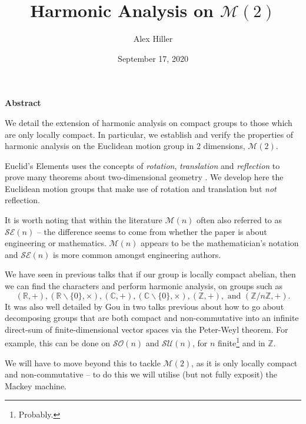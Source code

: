 \documentclass{article}
\author{Alex Hiller}
\title{Harmonic Analysis on $\mathcal{M}(2)$}
\date{September 17, 2020}
\begin{document}
\maketitle
\begin{center}
    \textbf{Abstract}
\end{center}
We detail the extension of harmonic analysis on compact groups to those which are only locally compact. In particular, we establish and verify the properties of harmonic analysis on the Euclidean motion group in 2 dimensions, $\mathcal{M}(2)$.

\clearpage

Euclid's Elements uses the concepts of \textit{rotation}, \textit{translation} and \textit{reflection} to prove many theorems about two-dimensional geometry \cite{euclids_elements}. We develop here the Euclidean motion groups that make use of {rotation} and {translation} but \textit{not} reflection. \par
It is worth noting that within the literature $\mathcal{M}(n)$ often also referred to as $\mathcal{SE}(n)$ -- the difference seems to come from whether the paper is about engineering or mathematics. $\mathcal{M}(n)$ appears to be the mathematician's notation and $\mathcal{SE}(n)$ is more common amongst engineering authors.

We have seen in previous talks that if our group is locally compact abelian, then we can find the characters and perform harmonic analysis, on groups such as \[(\mathbb{R}, +), (\mathbb{R}\backslash \{ 0 \}, \times),(\mathbb{C}, +), (\mathbb{C}\backslash \{ 0 \}, \times),  (\mathbb{Z}, +), \text{ and }(\mathbb{Z}/n\mathbb{Z}, +).\]
It was also well detailed by Gou in two talks previous about how to go about decomposing groups that are both compact and non-commutative into an infinite direct-sum of finite-dimensional vector spaces via the Peter-Weyl theorem. For example, this can be done on $\mathcal{SO}(n)$ and $\mathcal{SU}(n)$, for $n$ finite\footnote{Probably.} and in $\mathbb{Z}$.

We will have to move beyond this to tackle $\mathcal{M}(2)$, as it is only locally compact and non-commutative -- to do this we will utilise (but not fully exposit) the Mackey machine.
\end{document}
